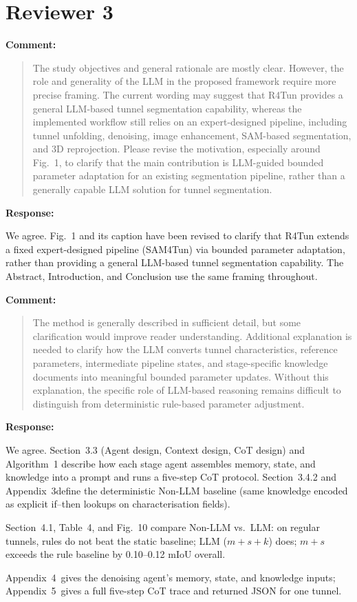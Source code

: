 \documentclass[11pt,a4paper]{article}
\newcommand{\MSAblationBarFigure}{Fig.~10}
\newcommand{\MSAppendixRuleBaseline}{Appendix~3}
\newcommand{\MSAppendixContext}{Appendix~4}
\newcommand{\MSAppendixCoT}{Appendix~5}
\newenvironment{commentblock}{%
  \par\smallskip\noindent\textbf{Comment:}\par
  \begin{quote}\itshape\color{black}
}{%
  \end{quote}\smallskip
}
\newenvironment{responseblock}{%
  \par\smallskip\noindent\textbf{Response:}\par
  \begingroup\color{responsegreen}
}{%
  \endgroup\smallskip
}
\begin{document}
\section*{Reviewer 3}

\begin{commentblock}
The study objectives and general rationale are mostly clear. However, the role and generality of the LLM in the proposed framework require more precise framing. The current wording may suggest that R4Tun provides a general LLM-based tunnel segmentation capability, whereas the implemented workflow still relies on an expert-designed pipeline, including tunnel unfolding, denoising, image enhancement, SAM-based segmentation, and 3D reprojection. Please revise the motivation, especially around Fig.~1, to clarify that the main contribution is LLM-guided bounded parameter adaptation for an existing segmentation pipeline, rather than a generally capable LLM solution for tunnel segmentation.
\end{commentblock}
\begin{responseblock}
We agree. Fig.~1 and its caption have been revised to clarify that R4Tun extends a fixed expert-designed pipeline (SAM4Tun) via bounded parameter adaptation, rather than providing a general LLM-based tunnel segmentation capability. The Abstract, Introduction, and Conclusion use the same framing throughout.
\end{responseblock}

\begin{commentblock}
The method is generally described in sufficient detail, but some clarification would improve reader understanding. Additional explanation is needed to clarify how the LLM converts tunnel characteristics, reference parameters, intermediate pipeline states, and stage-specific knowledge documents into meaningful bounded parameter updates. Without this explanation, the specific role of LLM-based reasoning remains difficult to distinguish from deterministic rule-based parameter adjustment.
\end{commentblock}
\begin{responseblock}
We agree. Section~3.3 (Agent design, Context design, CoT design) and Algorithm~1 describe how each stage agent assembles memory, state, and knowledge into a prompt and runs a five-step CoT protocol. Section~3.4.2 and \MSAppendixRuleBaseline define the deterministic Non-LLM baseline (same knowledge encoded as explicit if--then lookups on characterisation fields).

Section~4.1, Table~4, and \MSAblationBarFigure{} compare Non-LLM vs.\ LLM: on regular tunnels, rules do not beat the static baseline; LLM ($m+s+k$) does; $m+s$ exceeds the rule baseline by 0.10--0.12 mIoU overall.

\MSAppendixContext \ gives the denoising agent's memory, state, and knowledge inputs; \MSAppendixCoT \ gives a full five-step CoT trace and returned JSON for one tunnel.
\end{responseblock}
\end{document}
